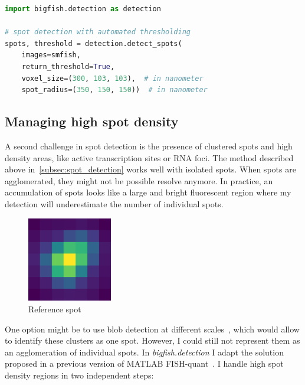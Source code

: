 \begin{minipage}{0.9\textwidth}
\begin{lstlisting}[language=Python]
import bigfish.detection as detection

# spot detection with automated thresholding
spots, threshold = detection.detect_spots(
    images=smfish,
    return_threshold=True,
    voxel_size=(300, 103, 103),  # in nanometer
    spot_radius=(350, 150, 150))  # in nanometer
\end{lstlisting}
\end{minipage}

\subsection{Managing high spot density}
\label{subsec:dense_decomposition}

A second challenge in spot detection is the presence of clustered spots and high density areas, like active transcription sites or \ac{RNA} foci.
The method described above in~\ref{subsec:spot_detection} works well with isolated spots.
When spots are agglomerated, they might not be possible resolve anymore.
In practice, an accumulation of spots looks like a large and bright fluorescent region where my detection will underestimate the number of individual spots.

\begin{figure}
	\begin{center}
		\includegraphics[width=0.33\textwidth]{figures/chapter2/reference_spot}
	\caption[Reference spot]{Reference spot}
	\label{fig:reference_spot}
	\end{center}
\end{figure}

One option might be to use blob detection at different scales~\cite{walt_scikit-image_2014}, which would allow to identify these clusters as one spot.
However, I could still not represent them as an agglomeration of individual spots.
In \emph{bigfish.detection} I adapt the solution proposed in a previous version of MATLAB FISH-quant~\cite{mueller_fish-quant_2013, samacoits_computational_2018}.
I handle high spot density regions in two independent steps:

